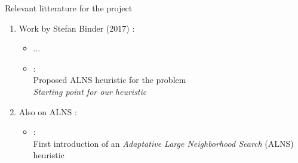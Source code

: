 \documentclass{EESD}
\begin{document}
\begin{frame}{Relevant litterature for the project}
	\begin{enumerate}
		\item Work by Stefan Binder (2017) : \begin{itemize}
			\item ...
			\item \textbf{\cite{BINDER_heuristic}} : \\
				Proposed ALNS heuristic for the problem \\
				{\it Starting point for our heuristic}
		\end{itemize}
		\item Also on ALNS : \begin{itemize}
				\item \textbf{\cite{ALNS}} : \\
				First introduction of an {\it Adaptative Large Neighborhood Search} (ALNS) heuristic
			\end{itemize}
	\end{enumerate}
\end{frame}
\end{document}
